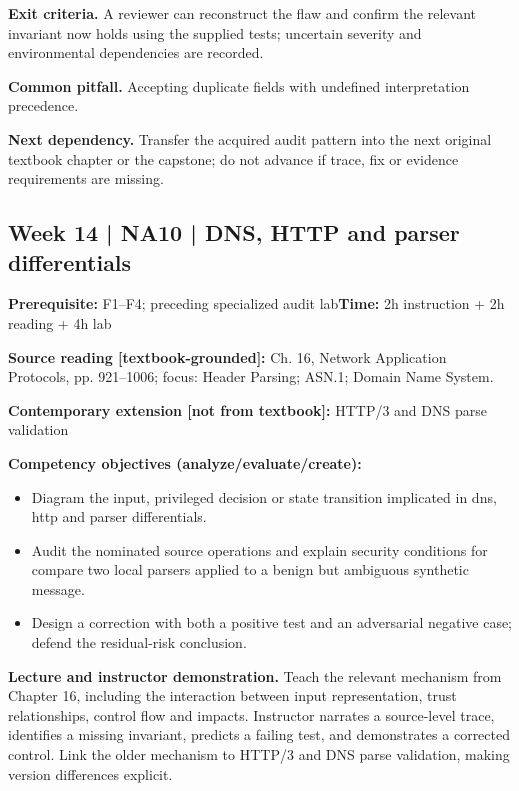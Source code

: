 \documentclass[10pt,letterpaper]{article}
\begin{document}
\textbf{Exit criteria.} A reviewer can reconstruct the flaw and confirm the relevant invariant now holds using the supplied tests; uncertain severity and environmental dependencies are recorded.

\textbf{Common pitfall.} Accepting duplicate fields with undefined interpretation precedence.

\textbf{Next dependency.} Transfer the acquired audit pattern into the next original textbook chapter or the capstone; do not advance if trace, fix or evidence requirements are missing.

\subsection{Week 14 | NA10 | DNS, HTTP and parser differentials}
\textbf{Prerequisite:} F1--F4; preceding specialized audit lab\hfill\textbf{Time:} 2h instruction + 2h reading + 4h lab

\textbf{Source reading [textbook-grounded]:} Ch. 16, Network Application Protocols, pp. 921--1006; focus: Header Parsing; ASN.1; Domain Name System.

\textbf{Contemporary extension [not from textbook]:} HTTP/3 and DNS parse validation

\textbf{Competency objectives (analyze/evaluate/create):}
\begin{itemize}[leftmargin=*,itemsep=2pt]
\item Diagram the input, privileged decision or state transition implicated in dns, http and parser differentials.
\item Audit the nominated source operations and explain security conditions for compare two local parsers applied to a benign but ambiguous synthetic message.
\item Design a correction with both a positive test and an adversarial negative case; defend the residual-risk conclusion.
\end{itemize}
\textbf{Lecture and instructor demonstration.} Teach the relevant mechanism from Chapter 16, including the interaction between input representation, trust relationships, control flow and impacts. Instructor narrates a source-level trace, identifies a missing invariant, predicts a failing test, and demonstrates a corrected control. Link the older mechanism to HTTP/3 and DNS parse validation, making version differences explicit.
\end{document}
